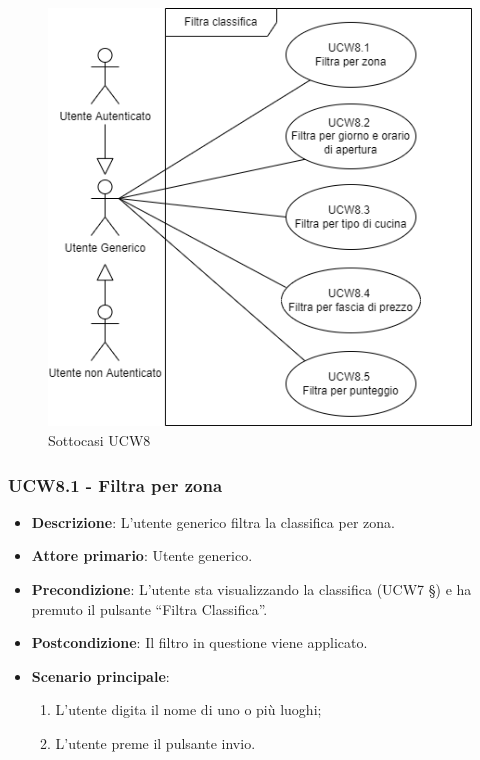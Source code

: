 \begin{figure}[!h]
\centering
    \includegraphics[scale=0.5]{UC_images/UCW8-.png}
    \caption{Sottocasi UCW8}
\end{figure}

\subsubsection{UCW8.1 - Filtra per zona}
\begin{itemize}
	\item \textbf{Descrizione}: L'utente generico filtra la classifica per zona.
    \item \textbf{Attore primario}: Utente generico.
    \item \textbf{Precondizione}: L’utente sta visualizzando la classifica (UCW7 §) e ha premuto il pulsante “Filtra Classifica”.
    \item \textbf{Postcondizione}: Il filtro in questione viene applicato.
    \item \textbf{Scenario principale}: 
    \begin{enumerate}
        \item L’utente digita il nome di uno o più luoghi;
        \item L’utente preme il pulsante invio.
    \end{enumerate}
\end{itemize}

